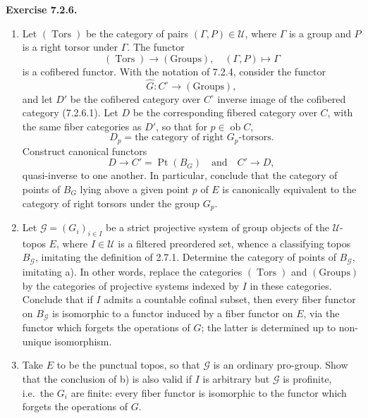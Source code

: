\documentclass[11pt]{article}
\newcommand{\U}{\mathcal{U}}
\newcommand{\Ppoint}{\operatorname{Pt}}
\newcommand{\Ttors}{\operatorname{Tors}}
\newcommand{\ie}{i.e.}
\newenvironment{remarktext}[1]{\par\medskip\noindent\textbf{#1.}\ }{\par\medskip}
\providecommand{\ob}{\operatorname{ob}}
\providecommand{\Ttors}{\operatorname{Tors}}
\providecommand{\quav}{\quad\text{and}\quad}
\begin{document}
\begin{remarktext}{Exercise 7.2.6}
\begin{enumerate}[label=\alph*)]
\item Let \((\Ttors)\) be the category of pairs \((\Gamma,P)\in\U\), where \(\Gamma\) is a group and \(P\) is a right torsor under \(\Gamma\). The functor
\begin{equation*}
(\Ttors)\longrightarrow(\text{Groups}),\quad (\Gamma,P)\longmapsto\Gamma\tag{7.2.6.1}
\end{equation*}
is a cofibered functor. With the notation of 7.2.4, consider the functor
\[
\widehat G:C^\circ\longrightarrow(\text{Groups}),
\]
and let \(D'\) be the cofibered category over \(C^\circ\) inverse image of the cofibered category (7.2.6.1). Let \(D\) be the corresponding fibered category over \(C\), with the same fiber categories as \(D'\), so that for \(p\in\ob C\),
\[
D_p=\text{the category of right }G_p\text{-torsors}.
\]
Construct canonical functors
\begin{equation*}
D\longrightarrow C'=\Ppoint(B_G)\quav C'\longrightarrow D,\tag{7.2.6.2}
\end{equation*}
quasi-inverse to one another. In particular, conclude that the category of points of \(B_G\) lying above a given point \(p\) of \(E\) is canonically equivalent to the category of right torsors under the group \(G_p\).

\item Let \(\mathcal G=(G_i)_{i\in I}\) be a strict projective system of group objects of the \(\U\)-topos \(E\), where \(I\in\U\) is a filtered preordered set, whence a classifying topos \(B_{\mathcal G}\), imitating the definition of 2.7.1. Determine the category of points of \(B_{\mathcal G}\), imitating a). In other words, replace the categories \((\Ttors)\) and \((\text{Groups})\) by the categories of projective systems indexed by \(I\) in these categories. Conclude that if \(I\) admits a countable cofinal subset, then every fiber functor on \(B_{\mathcal G}\) is isomorphic to a functor induced by a fiber functor on \(E\), via the functor which forgets the operations of \(G\); the latter is determined up to non-unique isomorphism.

\item Take \(E\) to be the punctual topos, so that \(\mathcal G\) is an ordinary pro-group. Show that the conclusion of b) is also valid if \(I\) is arbitrary but \(\mathcal G\) is profinite, \ie\ the \(G_i\) are finite: every fiber functor is isomorphic to the functor which forgets the operations of \(G\).


\end{enumerate}
\end{remarktext}
\end{document}
